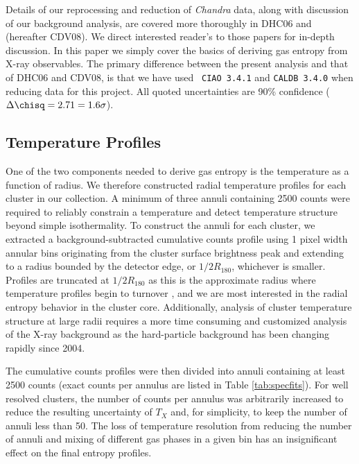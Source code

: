 \documentclass[12pt, preprint]{aastex}
\begin{document}
Details of our reprocessing and reduction of {\it Chandra} data, along
with discussion of our background analysis, are covered more
thoroughly in DHC06 and \citealt{xrayband} (hereafter CDV08). We
direct interested reader's to those papers for in-depth
discussion. In this paper we simply cover the basics of deriving gas
entropy from X-ray observables. The primary difference between the
present analysis and that of DHC06 and CDV08, is that we have used {\tt
CIAO 3.4.1} and {\tt CALDB 3.4.0} when reducing data for this
project. All quoted uncertainties are 90\% confidence ($\Delta\chisq=
2.71 = 1.6\sigma$).

\subsection{Temperature Profiles}
\label{sec:temppr}

One of the two components needed to derive gas entropy is the
temperature as a function of radius. We therefore constructed radial
temperature profiles for each cluster in our collection. A minimum of
three annuli containing 2500 counts were required to reliably constrain
a temperature and detect temperature structure beyond simple
isothermality. To construct the annuli for each cluster, we extracted
a background-subtracted cumulative counts profile using 1 pixel width
annular bins originating from the cluster surface brightness peak and
extending to a radius bounded by the detector edge, or $1/2 R_{180}$,
whichever is smaller. Profiles are truncated at $1/2 R_{180}$ as this
is the approximate radius where temperature profiles begin to turnover
\citep{2005ApJ...628..655V}, and we are most interested in the radial
entropy behavior in the cluster core. Additionally, analysis of
cluster temperature structure at large radii requires a more time
consuming and customized analysis of the X-ray background as the
hard-particle background has been changing rapidly since 2004.

The cumulative counts profiles were then divided into annuli
containing at least 2500 counts (exact counts per annulus are listed
in Table \ref{tab:specfits}). For well resolved clusters, the number
of counts per annulus was arbitrarily increased to reduce the
resulting uncertainty of $T_X$ and, for simplicity, to keep the number
of annuli less than 50. The loss of temperature resolution from
reducing the number of annuli and mixing of different gas phases in a
given bin has an insignificant effect on the final entropy profiles.
\end{document}
